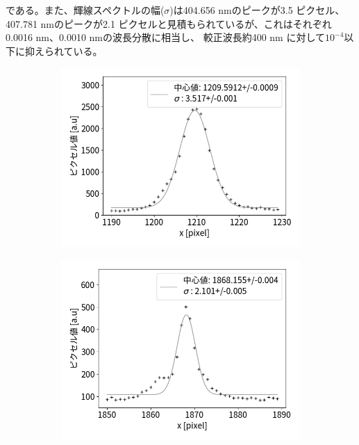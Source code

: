 \documentclass[a4paper,11pt,uplatex]{jsbook}
\begin{document}
である。また、輝線スペクトルの幅($\sigma$)は404.656 nmのピークが3.5 ピクセル、407.781 nmのピークが2.1 ピクセルと見積もられているが、これはそれぞれ0.0016 nm、0.0010 nmの波長分散に相当し、
較正波長約400 nm に対して$10^{-4}$以下に抑えられている。
\begin{figure}[h]
  \centering
  \begin{subfigure}[h]{0.45\linewidth}
    \centering
    \includegraphics[width=\linewidth]{image/4-fpeak.png}
  \end{subfigure}
  \hfill
  \begin{subfigure}[h]{0.45\linewidth}
    \centering
    \includegraphics[width=\linewidth]{image/4-speak.png}

\end{subfigure}
\end{figure}
\end{document}
